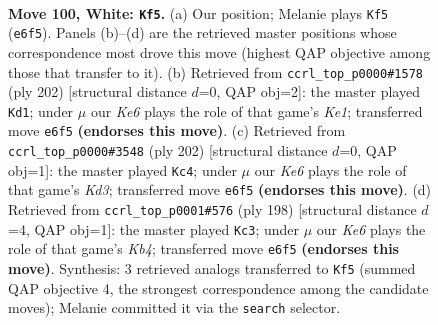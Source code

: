 \documentclass[11pt]{article}
\begin{document}
\clearpage

\begin{figure}[p]\centering
\begin{subfigure}{0.46\textwidth}\centering
\resizebox{\linewidth}{!}{%
\newchessgame
\chessboard[
  setfen={6Q1/8/4K3/7k/8/8/8/8 w - - 11 100},
  showmover=false,
  pgfstyle=straightmove, color=movearrow, markmove={e6-f5}
]}
\caption{}
\end{subfigure}\hfill
\begin{subfigure}{0.46\textwidth}\centering
\resizebox{\linewidth}{!}{%
\newchessgame
\chessboard[
  setfen={8/8/8/8/8/4Q3/1k6/4K3 w - - 6 102},
  showmover=false,
  pgfstyle=straightmove, color=movearrow, markmove={e1-d1}
]}
\caption{}
\end{subfigure}
\\[4pt]
\begin{subfigure}{0.46\textwidth}\centering
\resizebox{\linewidth}{!}{%
\newchessgame
\chessboard[
  setfen={3Q4/8/8/8/k7/3K4/8/8 w - - 4 102},
  showmover=false,
  pgfstyle=straightmove, color=movearrow, markmove={d3-c4}
]}
\caption{}
\end{subfigure}\hfill
\begin{subfigure}{0.46\textwidth}\centering
\resizebox{\linewidth}{!}{%
\newchessgame
\chessboard[
  setfen={8/8/8/8/1K6/8/5Q2/2k5 w - - 10 100},
  showmover=false,
  pgfstyle=straightmove, color=movearrow, markmove={b4-c3}
]}
\caption{}
\end{subfigure}
\caption{\textbf{Move 100, White: \texttt{Kf5}.} (a) Our position; Melanie plays \texttt{Kf5} (\texttt{e6f5}). Panels (b)--(d) are the retrieved master positions whose correspondence most drove this move (highest QAP objective among those that transfer to it). (b) Retrieved from \texttt{ccrl\_top\_p0000\#1578} (ply 202) [structural distance $d$=0, QAP obj=2]: the master played \texttt{Kd1}; under $\mu$ our \emph{Ke6} plays the role of that game's \emph{Ke1}; transferred move \texttt{e6f5} \textbf{(endorses this move)}. (c) Retrieved from \texttt{ccrl\_top\_p0000\#3548} (ply 202) [structural distance $d$=0, QAP obj=1]: the master played \texttt{Kc4}; under $\mu$ our \emph{Ke6} plays the role of that game's \emph{Kd3}; transferred move \texttt{e6f5} \textbf{(endorses this move)}. (d) Retrieved from \texttt{ccrl\_top\_p0001\#576} (ply 198) [structural distance $d$=4, QAP obj=1]: the master played \texttt{Kc3}; under $\mu$ our \emph{Ke6} plays the role of that game's \emph{Kb4}; transferred move \texttt{e6f5} \textbf{(endorses this move)}. Synthesis: 3 retrieved analogs transferred to \texttt{Kf5} (summed QAP objective 4, the strongest correspondence among the candidate moves); Melanie committed it via the \texttt{search} selector.}
\label{fig:thought-m198}
\end{figure}
\end{document}
